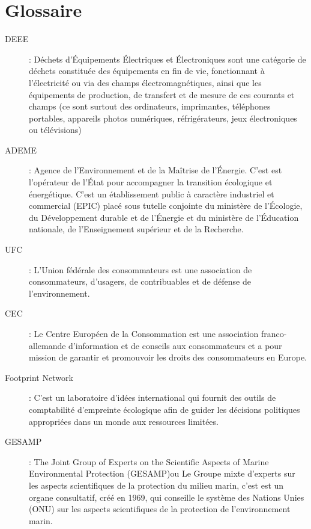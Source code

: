 \chapter{Glossaire}

\begin{description}

\item[DEEE] : Déchets d’Équipements Électriques et Électroniques sont une catégorie de déchets constituée des équipements en fin de vie, fonctionnant à l'électricité ou via des champs électromagnétiques, ainsi que les équipements de production, de transfert et de mesure de ces courants et champs (ce sont surtout des ordinateurs, imprimantes, téléphones portables, appareils photos numériques, réfrigérateurs, jeux électroniques ou télévisions) 

\item[ADEME] : Agence de l’Environnement et de la Maîtrise de l’Énergie. C'est est l'opérateur de l'État pour accompagner la transition écologique et énergétique. C'est un établissement public à caractère industriel et commercial (EPIC) placé sous tutelle conjointe du ministère de l’Écologie, du Développement durable et de l’Énergie et du ministère de l’Éducation nationale, de l’Enseignement supérieur et de la Recherche.

\item[UFC] : L'Union fédérale des consommateurs est une association de consommateurs, d'usagers, de contribuables et de défense de l'environnement.

\item[CEC] : Le Centre Européen de la Consommation est une association franco-allemande d’information et de conseils aux consommateurs et a pour mission  de garantir et promouvoir les droits des consommateurs en Europe.

\item[Footprint Network] : C'est un laboratoire d’idées international qui fournit des outils de comptabilité d'empreinte écologique afin de guider les décisions politiques appropriées dans un monde aux ressources limitées.

\item[GESAMP] : The Joint Group of Experts on the Scientific Aspects of Marine Environmental Protection (GESAMP)ou Le Groupe mixte d'experts sur les aspects scientifiques de la protection du milieu marin, c'est est un organe consultatif, créé en 1969, qui conseille le système des Nations Unies (ONU) sur les aspects scientifiques de la protection de l'environnement marin.


\end{description}
